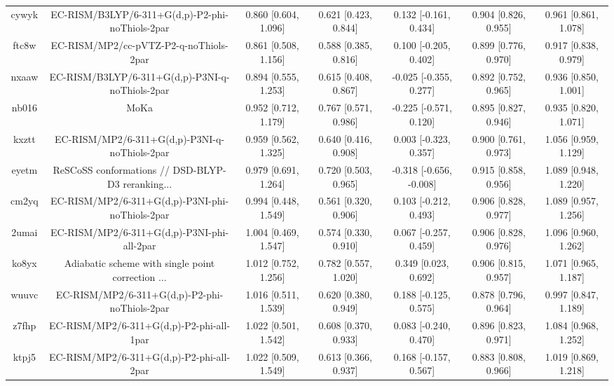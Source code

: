 \documentclass{article}
\begin{document}
\begin{center}
\begin{longtable}{|ccccccc|}
 cywyk &    EC-RISM/B3LYP/6-311+G(d,p)-P2-phi-noThiols-2par &  0.860 [0.604, 1.096] &  0.621 [0.423, 0.844] &    0.132 [-0.161, 0.434] &  0.904 [0.826, 0.955] &   0.961 [0.861, 1.078] \\
 ftc8w &             EC-RISM/MP2/cc-pVTZ-P2-q-noThiols-2par &  0.861 [0.508, 1.156] &  0.588 [0.385, 0.816] &    0.100 [-0.205, 0.402] &  0.899 [0.776, 0.970] &   0.917 [0.838, 0.979] \\
 nxaaw &    EC-RISM/B3LYP/6-311+G(d,p)-P3NI-q-noThiols-2par &  0.894 [0.555, 1.253] &  0.615 [0.408, 0.867] &   -0.025 [-0.355, 0.277] &  0.892 [0.752, 0.965] &   0.936 [0.850, 1.001] \\
 nb016 &                                               MoKa &  0.952 [0.712, 1.179] &  0.767 [0.571, 0.986] &   -0.225 [-0.571, 0.120] &  0.895 [0.827, 0.946] &   0.935 [0.820, 1.071] \\
 kxztt &      EC-RISM/MP2/6-311+G(d,p)-P3NI-q-noThiols-2par &  0.959 [0.562, 1.325] &  0.640 [0.416, 0.908] &    0.003 [-0.323, 0.357] &  0.900 [0.761, 0.973] &   1.056 [0.959, 1.129] \\
 eyetm &  ReSCoSS conformations // DSD-BLYP-D3 reranking... &  0.979 [0.691, 1.264] &  0.720 [0.503, 0.965] &  -0.318 [-0.656, -0.008] &  0.915 [0.858, 0.956] &   1.089 [0.948, 1.220] \\
 cm2yq &    EC-RISM/MP2/6-311+G(d,p)-P3NI-phi-noThiols-2par &  0.994 [0.448, 1.549] &  0.561 [0.320, 0.906] &    0.103 [-0.212, 0.493] &  0.906 [0.828, 0.977] &   1.089 [0.957, 1.256] \\
 2umai &         EC-RISM/MP2/6-311+G(d,p)-P3NI-phi-all-2par &  1.004 [0.469, 1.547] &  0.574 [0.330, 0.910] &    0.067 [-0.257, 0.459] &  0.906 [0.828, 0.976] &   1.096 [0.960, 1.262] \\
 ko8yx &  Adiabatic scheme with single point correction ... &  1.012 [0.752, 1.256] &  0.782 [0.557, 1.020] &     0.349 [0.023, 0.692] &  0.906 [0.815, 0.957] &   1.071 [0.965, 1.187] \\
 wuuvc &      EC-RISM/MP2/6-311+G(d,p)-P2-phi-noThiols-2par &  1.016 [0.511, 1.539] &  0.620 [0.380, 0.949] &    0.188 [-0.125, 0.575] &  0.878 [0.796, 0.964] &   0.997 [0.847, 1.189] \\
 z7fhp &           EC-RISM/MP2/6-311+G(d,p)-P2-phi-all-1par &  1.022 [0.501, 1.542] &  0.608 [0.370, 0.933] &    0.083 [-0.240, 0.470] &  0.896 [0.823, 0.971] &   1.084 [0.968, 1.252] \\
 ktpj5 &           EC-RISM/MP2/6-311+G(d,p)-P2-phi-all-2par &  1.022 [0.509, 1.549] &  0.613 [0.366, 0.937] &    0.168 [-0.157, 0.567] &  0.883 [0.808, 0.966] &   1.019 [0.869, 1.218] \\

\end{longtable}
\end{center}
\end{document}
